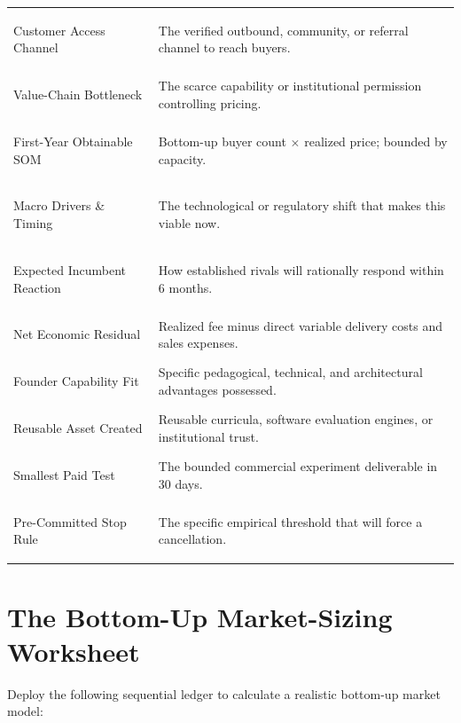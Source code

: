 \begin{tcolorbox}[
  enhanced,
  colback=BayesSurface!60,
  colframe=BayesBorder,
  boxrule=0.5pt,
  arc=3pt,
  left=3pt,right=3pt,top=3pt,bottom=3pt,
  boxsep=1pt
]
\begin{tabularx}{\linewidth}{>{\bfseries\raggedright\arraybackslash}p{2.3cm} X}
\addlinespace[2pt]
Customer Access Channel & The verified outbound, community, or referral channel to reach buyers. \\
\addlinespace[2pt]
Value-Chain Bottleneck & The scarce capability or institutional permission controlling pricing. \\
\addlinespace[2pt]
First-Year Obtainable SOM & Bottom-up buyer count $\times$ realized price; bounded by capacity. \\
\addlinespace[2pt]
Macro Drivers \& Timing & The technological or regulatory shift that makes this viable now. \\
\addlinespace[2pt]
Expected Incumbent Reaction & How established rivals will rationally respond within 6 months. \\
\addlinespace[2pt]
Net Economic Residual & Realized fee minus direct variable delivery costs and sales expenses. \\
\addlinespace[2pt]
Founder Capability Fit & Specific pedagogical, technical, and architectural advantages possessed. \\
\addlinespace[2pt]
Reusable Asset Created & Reusable curricula, software evaluation engines, or institutional trust. \\
\addlinespace[2pt]
Smallest Paid Test & The bounded commercial experiment deliverable in 30 days. \\
\addlinespace[2pt]
Pre-Committed Stop Rule & The specific empirical threshold that will force a cancellation. \\
\bottomrule
\end{tabularx}
\end{tcolorbox}

\section{The Bottom-Up Market-Sizing Worksheet}

Deploy the following sequential ledger to calculate a realistic bottom-up market model:

